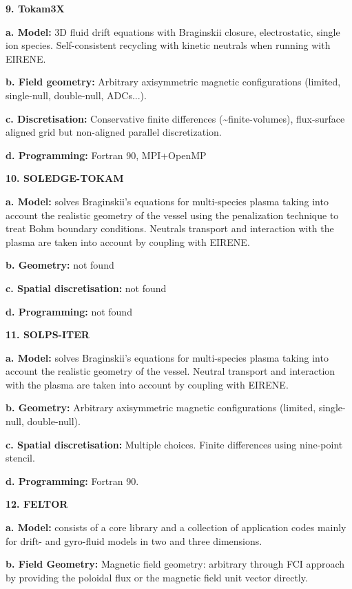 \documentclass{article}
\begin{document}
{ \textbf{9. Tokam3X }}{~\cite{ref [18]}}

\textbf{a. Model:} 3D fluid drift equations with Braginskii closure, electrostatic, 
single ion species. Self-consistent recycling with kinetic neutrals when running 
with EIRENE.

\textbf{b. Field geometry:} Arbitrary axisymmetric magnetic configurations (limited, 
single-null, double-null, ADCs...).

\textbf{c. Discretisation: }Conservative finite differences (\textasciitilde{}finite-volumes), 
flux-surface aligned grid but non-aligned parallel discretization.

\textbf{d. Programming:} Fortran 90, MPI+OpenMP

{ \textbf{10. SOLEDGE-TOKAM }}{~\cite{ref [19]}}

\textbf{a. Model: }{ solves Braginskii's equations for multi-species 
plasma taking into account the realistic geometry of the vessel using the penalization 
technique to treat Bohm boundary conditions. Neutrals transport and interaction 
with the plasma are taken into account by coupling with EIRENE.}

\textbf{b. Geometry: }not found

\textbf{c. Spatial discretisation: }not found

\textbf{d. Programming: }not found 

{ \textbf{11. SOLPS-ITER }}{~\cite{ref [20]}}

\textbf{a. Model: }{ solves Braginskii's equations for multi-species 
plasma taking into account the realistic geometry of the vessel. Neutral transport 
and interaction with the plasma are taken into account by coupling with EIRENE.}

\textbf{b. Geometry: }Arbitrary axisymmetric magnetic configurations (limited, 
single-null, double-null).

\textbf{c. Spatial discretisation: }Multiple choices. Finite differences using 
nine-point stencil.

\textbf{d. Programming: }Fortran 90.

{ \textbf{12. FELTOR }}{~\cite{ref [21]}}{ \textbf{ 
}}

\textbf{a. Model: }consists of a core library and a collection of application codes 
mainly for drift- and gyro-fluid models in two and three dimensions.

\textbf{b. Field Geometry: }Magnetic field geometry: arbitrary through FCI approach 
by providing the poloidal flux or the magnetic field unit vector directly.
\end{document}
